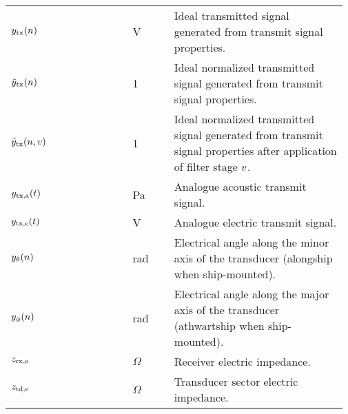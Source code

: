 \documentclass[12pt,a4paper]{article}
\begin{document}
\begin{longtable}{p{0.15\linewidth} p{0.20\linewidth} p{0.12\linewidth} p{0.5\linewidth} }
$y_{\textrm{tx}}(n)$ & & V & Ideal transmitted signal generated from transmit signal properties.\\
$\tilde{y}_{\textrm{tx}}(n)$ & & 1 & Ideal normalized transmitted signal generated from transmit signal properties.\\
$\tilde{y}_{\textrm{tx}}(n,v)$ & & 1 & Ideal normalized transmitted signal generated from transmit signal properties after application of filter stage $v$.\\

$y_{\textrm{tx,a}}(t)$ & & Pa & Analogue acoustic transmit signal.\\

$y_{\textrm{tx,e}}(t)$ & & V & Analogue electric transmit signal.\\

$y_\theta(n)$ & & rad & Electrical angle along the minor axis of the transducer (alongship when ship-mounted).\\
$y_\phi(n)$ & & rad & Electrical angle along the major axis of the transducer (athwartship when ship-mounted).\\

$z_{\textrm{rx,e}}$ & & $\Omega$ & Receiver electric impedance.\\
$z_{\textrm{td,e}}$ & & $\Omega$ & Transducer sector electric impedance.\\


\end{longtable}
\end{document}
